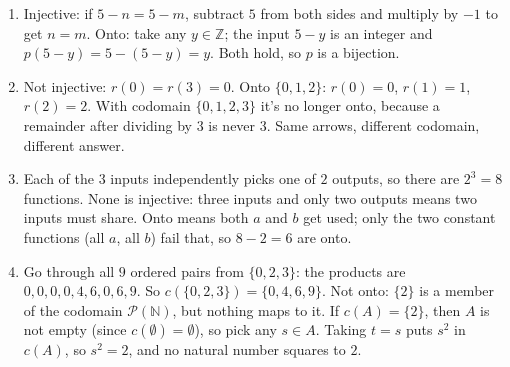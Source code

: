 \begin{enumerate}
\item Injective: if $5-n=5-m$, subtract $5$ from both sides and multiply by $-1$ to get $n=m$. Onto: take any $y\in\mathbb{Z}$; the input $5-y$ is an integer and $p(5-y)=5-(5-y)=y$. Both hold, so $p$ is a bijection.
\item Not injective: $r(0)=r(3)=0$. Onto $\{0,1,2\}$: $r(0)=0$, $r(1)=1$, $r(2)=2$. With codomain $\{0,1,2,3\}$ it's no longer onto, because a remainder after dividing by $3$ is never $3$. Same arrows, different codomain, different answer.
\item Each of the $3$ inputs independently picks one of $2$ outputs, so there are $2^3=8$ functions. None is injective: three inputs and only two outputs means two inputs must share. Onto means both $a$ and $b$ get used; only the two constant functions (all $a$, all $b$) fail that, so $8-2=6$ are onto.
\item Go through all $9$ ordered pairs from $\{0,2,3\}$: the products are $0,0,0,0,4,6,0,6,9$. So $c(\{0,2,3\})=\{0,4,6,9\}$. Not onto: $\{2\}$ is a member of the codomain $\mathcal{P}(\mathbb{N})$, but nothing maps to it. If $c(A)=\{2\}$, then $A$ is not empty (since $c(\emptyset)=\emptyset$), so pick any $s\in A$. Taking $t=s$ puts $s^2$ in $c(A)$, so $s^2=2$, and no natural number squares to $2$.
\end{enumerate}
